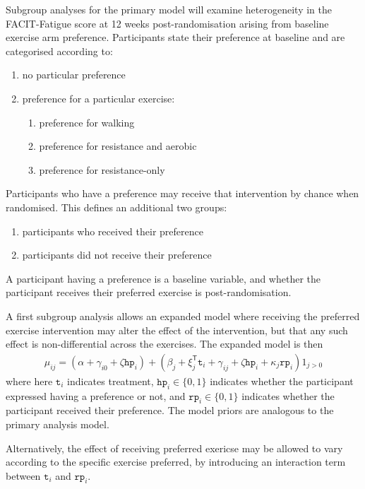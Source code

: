 \documentclass[
]{article}
\providecommand{\tightlist}{%
  \setlength{\itemsep}{0pt}\setlength{\parskip}{0pt}}
\begin{document}
Subgroup analyses for the primary model will examine heterogeneity in the FACIT-Fatigue score at 12 weeks post-randomisation arising from baseline exercise arm preference.
Participants state their preference at baseline and are categorised according to:

\begin{enumerate}\tightlist
  \item no particular preference
  \item preference for a particular exercise:
        \begin{enumerate}\tightlist
          \item preference for walking
          \item preference for resistance and aerobic
          \item preference for resistance-only
        \end{enumerate}
\end{enumerate}

Participants who have a preference may receive that intervention by chance when randomised.
This defines an additional two groups:
\begin{enumerate}\tightlist
  \item participants who received their preference
  \item participants did not receive their preference
\end{enumerate}

A participant having a preference is a baseline variable, and whether the participant receives their preferred exercise is post-randomisation.

A first subgroup analysis allows an expanded model where receiving the preferred exercise intervention may alter the effect of the intervention, but that any such effect is non-differential across the exercises.
The expanded model is then
$$
\begin{aligned}
\mu_{ij} = (\alpha + \gamma_{i0} + \zeta\texttt{hp}_i) + (\beta_j + \xi_{j}^\mathsf{T}\texttt{t}_i + \gamma_{ij} + \zeta\texttt{hp}_i + \kappa_j\texttt{rp}_i)1_{j>0}
\end{aligned}
$$
where here $\texttt{t}_i$ indicates treatment, $\texttt{hp}_i\in\{0,1\}$ indicates whether the participant expressed having a preference or not, and $\texttt{rp}_i\in\{0,1\}$ indicates whether the participant received their preference.
The model priors are analogous to the primary analysis model.

Alternatively, the effect of receiving preferred exericse may be allowed to vary according to the specific exercise preferred, by introducing an interaction term between $\texttt{t}_i$ and $\texttt{rp}_i$.
\end{document}
